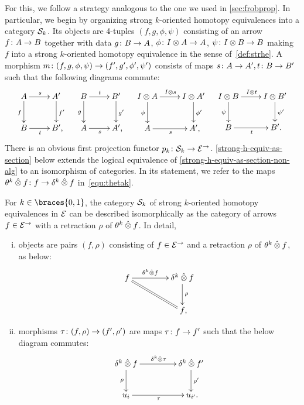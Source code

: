 \documentclass[reqno,10pt,a4paper,oneside,draft]{amsart}
\begin{document}
{{For this, we follow a strategy analogous to the one we used in \cref{sec:frobprop}. In particular, we begin
by organizing strong $k$-oriented homotopy equivalences into a category $\cal{S}_k$. Its objects are
4-tuples $(f, g, \phi, \psi)$ consisting of an arrow 
$f \co A \to B$ together with data $g \co B \to A$, $\phi \co \interval \otimes A \to A$, $\psi \co \interval \otimes B \to B$ making $f$ into a strong $k$-oriented homotopy equivalence in the sense of~\cref{def:strhe}.  A morphism $m \co (f, g, \phi, \psi) \to (f', g', \phi', \psi')$ consists of maps $s \co A \to A', t \co B \to B'$ such that the following diagrams commute:
\begin{align*}
\xymatrix{
  A
  \ar[r]^{s}
  \ar[d]_{f}
&
  A'
  \ar[d]^{f'}
\\
  B
  \ar[r]_{t}
&
  B'
\rlap{,}}
&&
\xymatrix{
  B
  \ar[r]^{t}
  \ar[d]_{g}
&
  B'
  \ar[d]^{g'}
\\
  A
  \ar[r]_{s}
&
  A'
\rlap{,}}
&&
\xymatrix{
  \interval \otimes A
  \ar[d]_{\phi}
  \ar[r]^{\interval \otimes s}
&
  I \otimes A'
  \ar[d]^{\phi'}
\\
  A
  \ar[r]_{s}
&
  A'
\rlap{,}}
&&
\xymatrix{
  \interval \otimes B
  \ar[d]_{\psi}
  \ar[r]^{\interval \otimes t}
&
  I \otimes B'
  \ar[d]^{\psi'}
\\
  B
  \ar[r]_{t}
&
  B'
\rlap{.}}
\end{align*}
There is an obvious first projection functor $p_k \co \cal{S}_k \to \catE^\to$. \cref{strong-h-equiv-as-section} below extends
the logical equivalence of \cref{strong-h-equiv-as-section-non-alg}  to an isomorphism of categories. In its statement, we refer
to the maps~$\thetak \hatotimes f \co f \to \kcyl \hatotimes f$ in~\eqref{equ:thetak}. 




\begin{lemma} \label{strong-h-equiv-as-section}
For $k \in \braces{0, 1}$, the category $\cal{S}_k$ of strong $k$-oriented homotopy equivalences in $\catE$ can be described isomorphically as the category of arrows $f \in \catE^{\to}$ with a retraction $\rho$ of $\thetak \hatotimes f$.
In detail,
\begin{enumerate}[(i)]
\item objects are pairs $(f, \rho)$ consisting of $f \in \catE^\to$ and a retraction $\rho$ of $\thetak \hatotimes f$, as below:
\[
\xymatrix@C+2em{
  f
  \ar[r]^-{\thetak \hatotimes f}
  \ar@{=}[dr]
&
  \kcyl \hatotimes f \ar[d]^{\rho}
\\&
  f
\rlap{,}}
\]
\item morphisms $\tau \co (f, \rho) \to (f', \rho')$ are maps $\tau \co f \to f'$ such that the below diagram commutes:
\[
\xymatrix@C+2em{
  \kcyl \hatotimes f
  \ar[d]_-{\rho}
  \ar[r]^{\kcyl \hatotimes \tau}
&
 \kcyl \hatotimes f'
  \ar[d]^-{\rho'}
\\
  u_i
  \ar[r]_{\tau}
&
  u_{i'}
\rlap{.}}
\]
\end{enumerate}
\end{lemma}

}}
\end{document}
